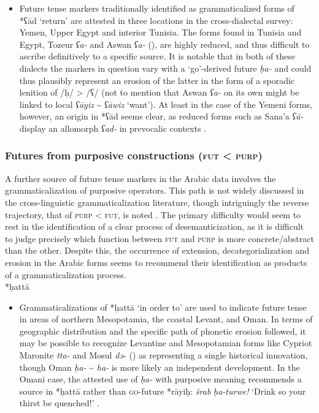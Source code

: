 \documentclass[output=paper]{langsci/langscibook}
\begin{document}
\begin{itemize}

  \item[]
Future tense markers traditionally identified as grammaticalized forms of *ʕād ‘return’ are attested in three locations in the cross-dialectal survey: Yemen, Upper Egypt and interior Tunisia. The forms found in Tunisia and Egypt, Tozeur \textit{ʕa-} and Aswan \textit{ʕa-} (\citealt{Saada1984,Schroepfer2019}), are highly reduced, and thus difficult to ascribe definitively to a specific source. It is notable that in both of these dialects the markers in question vary with a ‘go’-derived future \textit{ḥa-} and could thus plausibly represent an erosion of the latter in the form of a sporadic lenition of /ḥ/ > /ʕ/ (not to mention that Aswan \textit{ʕa-} on its own might be linked to local \textit{ʕāyiz} {\textasciitilde} \textit{ʕāwiz} ‘want’). At least in the case of the Yemeni forms, however, an origin in *ʕād seems clear, as reduced forms such as Sana’a \textit{ʕā-} display an allomorph \textit{ʕad-} in prevocalic contexts \citep{Watson1993}.
\end{itemize}

\subsubsection{ Futures from purposive constructions (\textsc{fut} < \textsc{purp})}

A further source of future tense markers in the Arabic data involves the grammaticalization of purposive operators. This path is not widely discussed in the cross-linguistic grammaticalization literature, though intriguingly the reverse trajectory, that of \textsc{purp} < \textsc{fut}, is noted \citep{Bybee1994}. The primary difficulty would seem to rest in the identification of a clear process of desemanticization, as it is difficult to judge precisely which function between \textsc{fut} and \textsc{purp} is more concrete/abstract than the other. Despite this, the occurrence of extension, decategorialization and erosion in the Arabic forms seems to recommend their identification as products of a grammaticalization process.\\
 
*ḥattā

\begin{itemize}

  \item[]
Grammaticalizations of *ḥattā ‘in order to’ are used to indicate future tense in areas of northern Mesopotamia, the coastal Levant, and Oman. In terms of geographic distribution and the specific path of phonetic erosion followed, it may be possible to recognize Levantine and Mesopotamian forms like Cypriot Maronite \textit{tta-} and Mosul \textit{də-} (\citealt{Borg1985,Jastrow1979}) as representing a single historical innovation, though Oman \textit{ḥa-} {\textasciitilde} \textit{ha-} is more likely an independent development. In the Omani case, the attested use of \textit{ḥa-} with purposive meaning recommends a source in *ḥattā rather than \textsc{go}{}-future *rāyiḥ: \textit{šrab} \textit{ḥa-turwe!} ‘Drink so your thirst be quenched!’ \citep[276]{Reinhardt1894}.
\end{itemize}
\end{document}
